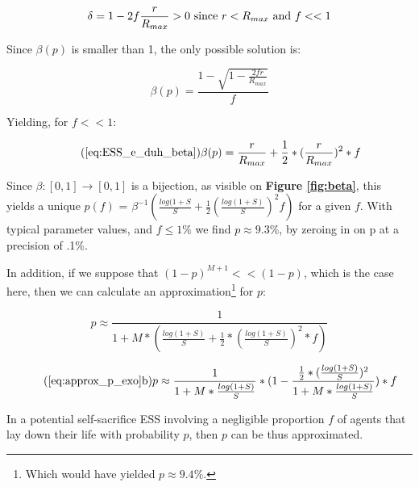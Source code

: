 \documentclass[a4paper,12pt]{report}
\begin{document}
\[\delta = 1 - 2f\frac{r}{R_{max}} > 0 \textnormal{ since } 
r<R_{max} \textnormal{ and } f << 1 
\]

Since $\beta(p)$ is smaller than 1, the
only possible solution is:

\[\beta(p) = \frac{1 - \sqrt{1-\frac{2fr}{R_{max}}}}{f} \]

Yielding, for $f << 1$:

\begin{equation}\tag{\ref{eq:ESS_e_duh_beta}}
    \beta(p) = \frac{r}{R_{max}}+\frac{1}{2}*(\frac{r}{R_{max}})^2*f
\end{equation}


Since $\beta \colon [0,1] \to [0,1]$ is a bijection, as visible on
 \textbf{Figure \ref{fig:beta}}, 
 this yields a unique $p(f)$ = $\beta^{-1}(\frac{log(1+S}{S} + \frac{1}{2}(\frac{log(1+S)}{S})^2f)$
 for a given $f$. With typical parameter values, and $f\leq 1\%$
 we find $p \approx 9.3\%$, by zeroing in on p at a precision of .1\%.

 In addition, if we suppose that $(1-p)^{M+1} << (1-p)$, which is the case here, then we
 can calculate an approximation\footnote{Which would have yielded
 $p \approx 9.4\%$.} for $p$:

 \[p \approx \frac{1}{1+M*(\frac{log(1+S)}{S} + \frac{1}{2}*(\frac{log(1+S)}{S})^2*f)}\]


 \begin{equation}
    \tag{\ref{eq:approx_p_exo}b}
    p \approx \frac{1}{1+M*\frac{log(1+S)}{S}}*
    (1- \frac{\frac{1}{2}*
    (\frac{log(1+S)}{S})^2}{1+M*\frac{log(1+S)}{S}})*f
    \label{eq:p_grr_approx}
    \end{equation}



 In a potential self-sacrifice ESS involving a negligible proportion $f$ of agents that lay down their
 life with probability $p$, then $p$ can be thus approximated.


 
\end{document}
